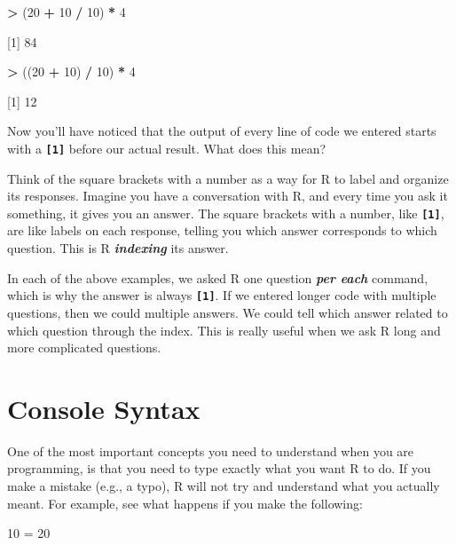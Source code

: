 \documentclass[
]{book}
\newenvironment{Shaded}{\begin{snugshade}}{\end{snugshade}}
\newcommand{\DecValTok}[1]{\textcolor[rgb]{0.00,0.00,0.81}{#1}}
\newcommand{\NormalTok}[1]{#1}
\newcommand{\OtherTok}[1]{\textcolor[rgb]{0.56,0.35,0.01}{#1}}
\newcommand{\SpecialCharTok}[1]{\textcolor[rgb]{0.81,0.36,0.00}{\textbf{#1}}}
\begin{document}
\begin{Shaded}
\begin{Highlighting}[]
\SpecialCharTok{\textgreater{}}\NormalTok{ (}\DecValTok{20} \SpecialCharTok{+} \DecValTok{10} \SpecialCharTok{/} \DecValTok{10}\NormalTok{) }\SpecialCharTok{*} \DecValTok{4} 

\NormalTok{[}\DecValTok{1}\NormalTok{] }\DecValTok{84}

\SpecialCharTok{\textgreater{}}\NormalTok{ ((}\DecValTok{20} \SpecialCharTok{+} \DecValTok{10}\NormalTok{) }\SpecialCharTok{/} \DecValTok{10}\NormalTok{) }\SpecialCharTok{*} \DecValTok{4}

\NormalTok{[}\DecValTok{1}\NormalTok{] }\DecValTok{12}
\end{Highlighting}
\end{Shaded}

Now you'll have noticed that the output of every line of code we entered starts with a \textbf{\texttt{{[}1{]}}} before our actual result. What does this mean?

Think of the square brackets with a number as a way for R to label and organize its responses. Imagine you have a conversation with R, and every time you ask it something, it gives you an answer. The square brackets with a number, like \textbf{\texttt{{[}1{]}}}, are like labels on each response, telling you which answer corresponds to which question. This is R \textbf{\emph{indexing}} its answer.

In each of the above examples, we asked R one question \textbf{\emph{per each}} command, which is why the answer is always \textbf{\texttt{{[}1{]}}}. If we entered longer code with multiple questions, then we could multiple answers. We could tell which answer related to which question through the index. This is really useful when we ask R long and more complicated questions.

\hypertarget{console-syntax}{%
\section{Console Syntax}\label{console-syntax}}

One of the most important concepts you need to understand when you are programming, is that you need to type exactly what you want R to do. If you make a mistake (e.g., a typo), R will not try and understand what you actually meant. For example, see what happens if you make the following:

\begin{Shaded}
\begin{Highlighting}[]
\DecValTok{10} \OtherTok{=} \DecValTok{20}
\end{Highlighting}
\end{Shaded}
\end{document}
